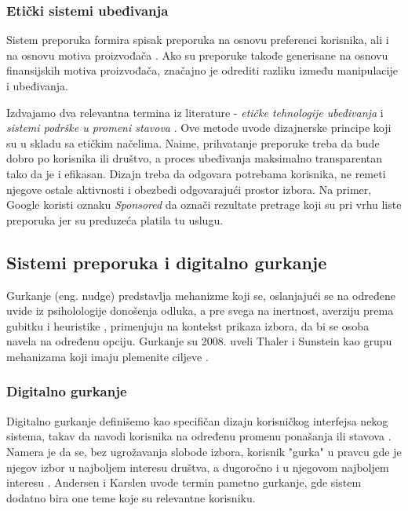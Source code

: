 \documentclass[a4paper]{article}
\begin{document}
\subsubsection{Etički sistemi ubeđivanja}
Sistem preporuka formira spisak preporuka na osnovu preferenci korisnika, ali i na osnovu motiva proizvođača \cite{Yoo_Gretzel_Zanker_2013}. Ako su preporuke takođe generisane na osnovu finansijskih motiva proizvođača, značajno je odrediti razliku između manipulacije i ubeđivanja. 

Izdvajamo dva relevantna termina iz literature - {\it etičke tehnologije ubeđivanja} \cite{Benner_2022} i {\it sistemi podrške u promeni stavova} \cite{Karppinen_Oinas-Kukkonen_2013}. Ove metode uvode dizajnerske principe koji su u skladu sa etičkim načelima. Naime, prihvatanje preporuke treba da bude dobro po korisnika ili društvo, a proces ubeđivanja maksimalno transparentan tako da je i efikasan. Dizajn treba da odgovara potrebama korisnika, ne remeti njegove ostale aktivnosti i obezbedi odgovarajući prostor izbora. Na primer, Google koristi oznaku {\it Sponsored} da označi rezultate pretrage koji su pri vrhu liste preporuka jer su preduzeća platila tu uslugu.

\subsection{Sistemi preporuka i digitalno gurkanje }
Gurkanje (eng. nudge) predstavlja mehanizme koji se, oslanjajući se na određene uvide iz psiholologije donošenja odluka, a pre svega na inertnost, averziju prema gubitku i heuristike \cite{Thaler_Sunstein_2008}, primenjuju na kontekst prikaza izbora, da bi se osoba navela na određenu opciju. Gurkanje su 2008. uveli Thaler i Sunstein kao grupu mehanizama koji imaju plemenite ciljeve \cite{Jesse_Jannach_2021}.

\subsubsection{Digitalno gurkanje}
Digitalno gurkanje definišemo kao specifičan dizajn korisničkog interfejsa nekog sistema, takav da navodi korisnika na određenu promenu ponašanja ili stavova \cite{Weinmann_Schneider_Brocke_2016}. Namera je da se, bez ugrožavanja slobode izbora, korisnik "gurka" u pravcu gde je njegov izbor u najboljem interesu društva, a dugoročno i u njegovom najboljem interesu \cite{Karlsen_Andersen_2019}. Andersen i Karslen \cite{Karlsen_Andersen_2019} uvode termin pametno gurkanje, gde sistem dodatno bira one teme koje su relevantne korisniku. 
\end{document}
